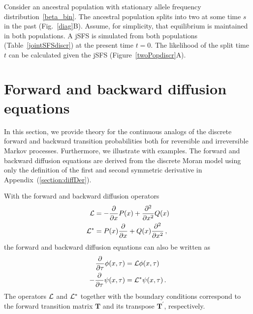 \documentclass[preprint]{elsarticle}
\begin{document}
Consider an ancestral population with stationary allele frequency distribution~\eqref{beta_bin}. The ancestral population splits into two at some time $s$ in the past (Fig.~\ref{diag}B). Assume, for simplicity, that equilibrium is maintained in both populations. A jSFS is simulated from both populations (Table~\ref{jointSFSdiscr}) at the present time $t=0$. The likelihood of the split time $t$ can be calculated given the jSFS (Figure~\ref{twoPopdiscr}A).



\section{Forward and backward diffusion equations}\label{forwBackDiff}

In this section, we provide theory for the continuous analogs of the discrete forward and backward transition probabilities both for reversible and irreversible Markov processes. Furthermore, we illustrate with examples.
The forward and backward diffusion equations are derived from the discrete Moran model using only the definition of the first and second symmetric derivative in Appendix~(\ref{section:diffDer}).

With the forward and backward diffusion operators 
\begin{equation}\label{eq:forw_backw_operator}
 \begin{split}
     {\cal L}&=-\frac{\partial}{\partial x}P(x)+ \frac{\partial^2}{\partial x^2}Q(x)\\
     {\cal L}^{*}&=P(x)\frac{\partial}{\partial x} +Q(x)\frac{\partial^2}{\partial x^2}\,,
 \end{split}
\end{equation}
the forward and backward diffusion equations can also be written as
\begin{equation}\label{eq:forw_backw_diff}
\begin{split}
\frac{\partial}{\partial \tau}\phi(x,\tau)&={\cal L} \phi(x, \tau)\\
-\frac{\partial}{\partial \tau}\psi(x,\tau)&={\cal L}^{*} \psi(x, \tau)\,.
\end{split}
\end{equation}
The operators ${\cal L}$ and ${\cal L}^{*}$ together with the boundary conditions correspond to the forward transition matrix $\mathbf{T}$ and its transpose $\mathbf{T}^{'}$, respectively. %
\end{document}
